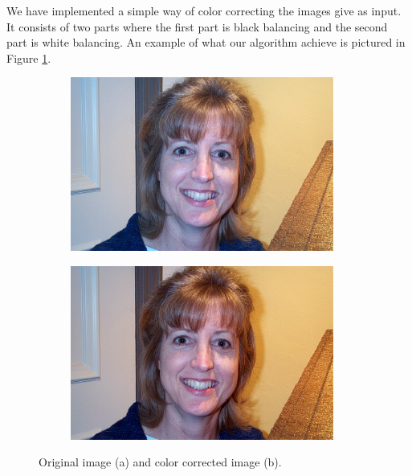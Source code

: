 We have implemented a simple way of color correcting the images give as input. It consists of two parts where the first part is black balancing and the second part is white balancing. An example of what our algorithm achieve is pictured in Figure \ref{fig:cc}.  

\begin{figure}[H]
\centering

\begin{subfigure}{.33\textwidth}
  \centering
  \includegraphics[width=0.95\textwidth]{img/cc/orig.jpg}
  \caption{}
\end{subfigure}%
\begin{subfigure}{.33\textwidth}
  \centering
  \includegraphics[width=0.95\textwidth]{img/cc/cc.png}
  \caption{}
\end{subfigure}%

\caption{Original image (a) and color corrected image (b).}


\label{fig:cc}
\end{figure}


